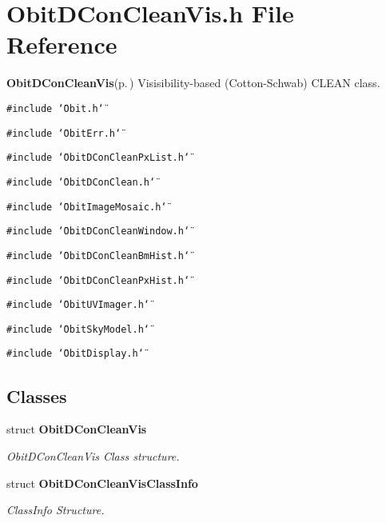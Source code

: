 \section{Obit\-DCon\-Clean\-Vis.h File Reference}
\label{ObitDConCleanVis_8h}
{\bf Obit\-DCon\-Clean\-Vis}{\rm (p.\,\pageref{structObitDConCleanVis})} Visisibility-based (Cotton-Schwab) CLEAN class. 

{\tt \#include \char`\"{}Obit.h\char`\"{}}\par
{\tt \#include \char`\"{}Obit\-Err.h\char`\"{}}\par
{\tt \#include \char`\"{}Obit\-DCon\-Clean\-Px\-List.h\char`\"{}}\par
{\tt \#include \char`\"{}Obit\-DCon\-Clean.h\char`\"{}}\par
{\tt \#include \char`\"{}Obit\-Image\-Mosaic.h\char`\"{}}\par
{\tt \#include \char`\"{}Obit\-DCon\-Clean\-Window.h\char`\"{}}\par
{\tt \#include \char`\"{}Obit\-DCon\-Clean\-Bm\-Hist.h\char`\"{}}\par
{\tt \#include \char`\"{}Obit\-DCon\-Clean\-Px\-Hist.h\char`\"{}}\par
{\tt \#include \char`\"{}Obit\-UVImager.h\char`\"{}}\par
{\tt \#include \char`\"{}Obit\-Sky\-Model.h\char`\"{}}\par
{\tt \#include \char`\"{}Obit\-Display.h\char`\"{}}\par
\subsection*{Classes}
\begin{CompactItemize}
\item 
struct {\bf Obit\-DCon\-Clean\-Vis}
\begin{CompactList}\small\item\em Obit\-DCon\-Clean\-Vis Class structure. \item\end{CompactList}\item 
struct {\bf Obit\-DCon\-Clean\-Vis\-Class\-Info}
\begin{CompactList}\small\item\em Class\-Info Structure. \item\end{CompactList}\end{CompactItemize}
